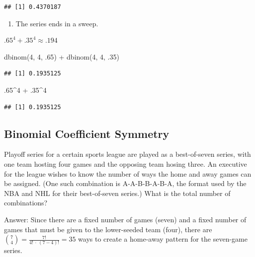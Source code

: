 \documentclass[
]{book}
\newenvironment{Shaded}{\begin{snugshade}}{\end{snugshade}}
\newcommand{\DecValTok}[1]{\textcolor[rgb]{0.00,0.00,0.81}{#1}}
\newcommand{\FunctionTok}[1]{\textcolor[rgb]{0.00,0.00,0.00}{#1}}
\newcommand{\NormalTok}[1]{#1}
\newcommand{\SpecialCharTok}[1]{\textcolor[rgb]{0.00,0.00,0.00}{#1}}
\providecommand{\tightlist}{%
  \setlength{\itemsep}{0pt}\setlength{\parskip}{0pt}}
\theoremstyle{definition}
\theoremstyle{definition}
\theoremstyle{definition}
\theoremstyle{definition}
\theoremstyle{remark}
\begin{document}
\begin{verbatim}
## [1] 0.4370187
\end{verbatim}

\begin{enumerate}
\def\labelenumi{(\alph{enumi})}
\setcounter{enumi}{3}
\tightlist
\item
  The series ends in a sweep.
\end{enumerate}

\(.65^4 + .35^4 \approx .194\)

\begin{Shaded}
\begin{Highlighting}[]
\FunctionTok{dbinom}\NormalTok{(}\DecValTok{4}\NormalTok{, }\DecValTok{4}\NormalTok{, .}\DecValTok{65}\NormalTok{) }\SpecialCharTok{+} \FunctionTok{dbinom}\NormalTok{(}\DecValTok{4}\NormalTok{, }\DecValTok{4}\NormalTok{, .}\DecValTok{35}\NormalTok{)}
\end{Highlighting}
\end{Shaded}

\begin{verbatim}
## [1] 0.1935125
\end{verbatim}

\begin{Shaded}
\begin{Highlighting}[]
\NormalTok{.}\DecValTok{65}\SpecialCharTok{\^{}}\DecValTok{4} \SpecialCharTok{+}\NormalTok{ .}\DecValTok{35}\SpecialCharTok{\^{}}\DecValTok{4}
\end{Highlighting}
\end{Shaded}

\begin{verbatim}
## [1] 0.1935125
\end{verbatim}

\hypertarget{binomial-coefficient-symmetry}{%
\subsection{Binomial Coefficient Symmetry}\label{binomial-coefficient-symmetry}}

Playoff series for a certain sports league are played as a best-of-seven series, with one team hosting four games and the opposing team hosing three. An executive for the league wishes to know the number of ways the home and away games can be assigned. (One such combination is A-A-B-B-A-B-A, the format used by the NBA and NHL for their best-of-seven series.) What is the total number of combinations?

Answer: Since there are a fixed number of games (seven) and a fixed number of games that must be given to the lower-seeded team (four), there are \(\binom{7}{4} = \frac{7!}{4!\ \cdot\ (7-4)!} = 35\) ways to create a home-away pattern for the seven-game series.
\end{document}
